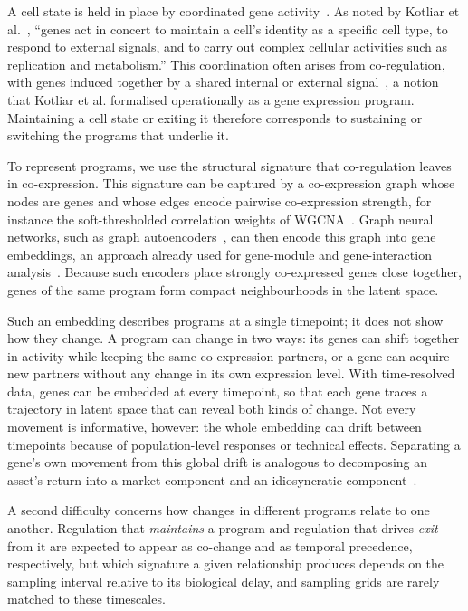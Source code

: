 \documentclass[10pt, letterpaper]{article}
\begin{document}
A cell state is held in place by coordinated gene activity~\cite{waddington1957strategy, huang2005attractor}. As noted by Kotliar et al.~\cite{kotliar2019cnmf}, ``genes act in concert to maintain a cell's identity as a specific cell type, to respond to external signals, and to carry out complex cellular activities such as replication and metabolism.'' This coordination often arises from co-regulation, with genes induced together by a shared internal or external signal~\cite{eisen1998cluster, segal2003modulenetworks}, a notion that Kotliar et al. formalised operationally as a gene expression program. Maintaining a cell state or exiting it therefore corresponds to sustaining or switching the programs that underlie it.

To represent programs, we use the structural signature that co-regulation leaves in co-expression. This signature can be captured by a co-expression graph whose nodes are genes and whose edges encode pairwise co-expression strength, for instance the soft-thresholded correlation weights of WGCNA~\cite{langfelder2008wgcna}. Graph neural networks, such as graph autoencoders~\cite{kipf2016vgae}, can then encode this graph into gene embeddings, an approach already used for gene-module and gene-interaction analysis~\cite{xing2022mlagnn, lee2022gnnwgcna}. Because such encoders place strongly co-expressed genes close together, genes of the same program form compact neighbourhoods in the latent space.

Such an embedding describes programs at a single timepoint; it does not show how they change. A program can change in two ways: its genes can shift together in activity while keeping the same co-expression partners, or a gene can acquire new partners without any change in its own expression level. With time-resolved data, genes can be embedded at every timepoint, so that each gene traces a trajectory in latent space that can reveal both kinds of change. Not every movement is informative, however: the whole embedding can drift between timepoints because of population-level responses or technical effects. Separating a gene's own movement from this global drift is analogous to decomposing an asset's return into a market component and an idiosyncratic component~\cite{sharpe1963simplified}.

A second difficulty concerns how changes in different programs relate to one another. Regulation that \emph{maintains} a program and regulation that drives \emph{exit} from it are expected to appear as co-change and as temporal precedence, respectively, but which signature a given relationship produces depends on the sampling interval relative to its biological delay, and sampling grids are rarely matched to these timescales.
\end{document}
